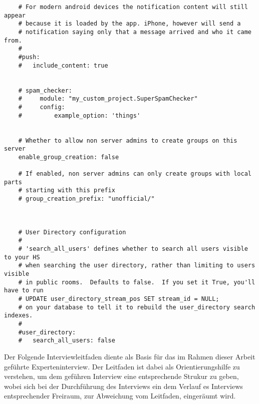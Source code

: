 \begin{lstlisting}
    # For modern android devices the notification content will still appear
    # because it is loaded by the app. iPhone, however will send a
    # notification saying only that a message arrived and who it came from.
    #
    #push:
    #   include_content: true
    
    
    # spam_checker:
    #     module: "my_custom_project.SuperSpamChecker"
    #     config:
    #         example_option: 'things'
    
    
    # Whether to allow non server admins to create groups on this server
    enable_group_creation: false
    
    # If enabled, non server admins can only create groups with local parts
    # starting with this prefix
    # group_creation_prefix: "unofficial/"
    
    
    
    # User Directory configuration
    #
    # 'search_all_users' defines whether to search all users visible to your HS
    # when searching the user directory, rather than limiting to users visible
    # in public rooms.  Defaults to false.  If you set it True, you'll have to run
    # UPDATE user_directory_stream_pos SET stream_id = NULL;
    # on your database to tell it to rebuild the user_directory search indexes.
    #
    #user_directory:
    #   search_all_users: false
\end{lstlisting}
\newpage
{}
Der Folgende Interviewleitfaden diente als Basis für das im Rahmen dieser Arbeit geführte Experteninterview. Der Leitfaden ist dabei als Orientierungshilfe zu verstehen, um dem geführen Interview eine entsprechende Strukur zu geben, wobei sich bei der Durchführung des Interviews ein dem Verlauf es Interviews entsprechender Freiraum, zur Abweichung vom Leitfaden, eingeräumt wird. 
